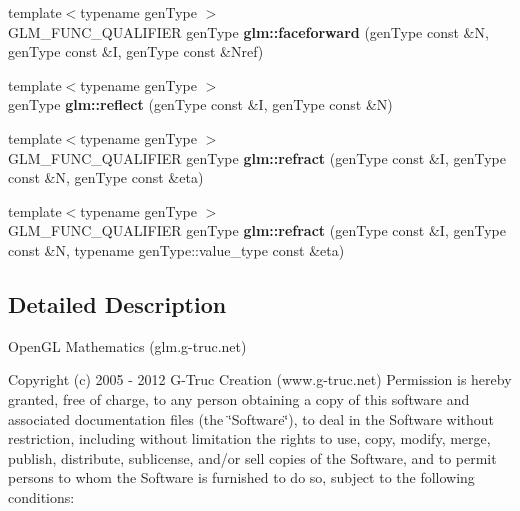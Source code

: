 \begin{DoxyCompactItemize}
\item 
\hypertarget{namespaceglm_ad32c7f0f9f0ca45467adbb4a1db5184d}{{\footnotesize template$<$typename gen\-Type $>$ }\\\-G\-L\-M\-\_\-\-F\-U\-N\-C\-\_\-\-Q\-U\-A\-L\-I\-F\-I\-E\-R gen\-Type {\bfseries glm\-::faceforward} (gen\-Type const \&\-N, gen\-Type const \&\-I, gen\-Type const \&\-Nref)}\label{namespaceglm_ad32c7f0f9f0ca45467adbb4a1db5184d}

\item 
\hypertarget{namespaceglm_abe1fa0bef5f854242eb70ce56e5a7d03}{{\footnotesize template$<$typename gen\-Type $>$ }\\gen\-Type {\bfseries glm\-::reflect} (gen\-Type const \&\-I, gen\-Type const \&\-N)}\label{namespaceglm_abe1fa0bef5f854242eb70ce56e5a7d03}

\item 
\hypertarget{namespaceglm_a9aa448ae8257316d0bd2a7ba6e9f201d}{{\footnotesize template$<$typename gen\-Type $>$ }\\\-G\-L\-M\-\_\-\-F\-U\-N\-C\-\_\-\-Q\-U\-A\-L\-I\-F\-I\-E\-R gen\-Type {\bfseries glm\-::refract} (gen\-Type const \&\-I, gen\-Type const \&\-N, gen\-Type const \&eta)}\label{namespaceglm_a9aa448ae8257316d0bd2a7ba6e9f201d}

\item 
\hypertarget{namespaceglm_a8ca97caf619ea1ce3a8bf27aacad99d0}{{\footnotesize template$<$typename gen\-Type $>$ }\\\-G\-L\-M\-\_\-\-F\-U\-N\-C\-\_\-\-Q\-U\-A\-L\-I\-F\-I\-E\-R gen\-Type {\bfseries glm\-::refract} (gen\-Type const \&\-I, gen\-Type const \&\-N, typename gen\-Type\-::value\-\_\-type const \&eta)}\label{namespaceglm_a8ca97caf619ea1ce3a8bf27aacad99d0}

\end{DoxyCompactItemize}


\subsection{\-Detailed \-Description}
\-Open\-G\-L \-Mathematics (glm.\-g-\/truc.\-net)

\-Copyright (c) 2005 -\/ 2012 \-G-\/\-Truc \-Creation (www.\-g-\/truc.\-net) \-Permission is hereby granted, free of charge, to any person obtaining a copy of this software and associated documentation files (the \char`\"{}\-Software\char`\"{}), to deal in the \-Software without restriction, including without limitation the rights to use, copy, modify, merge, publish, distribute, sublicense, and/or sell copies of the \-Software, and to permit persons to whom the \-Software is furnished to do so, subject to the following conditions\-:

